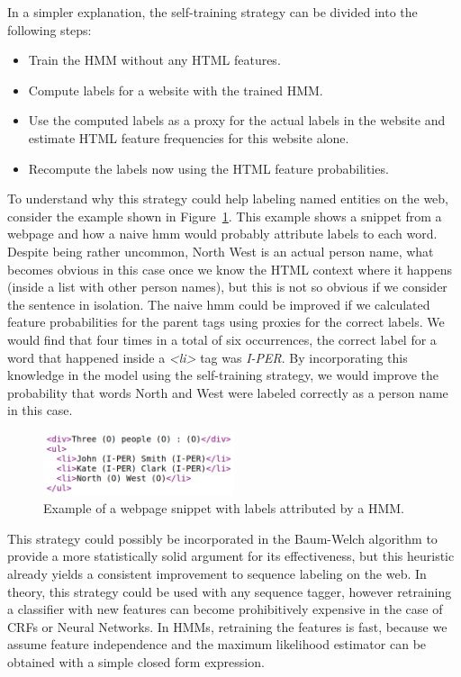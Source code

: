 \documentclass{nle}
\begin{document}
In a simpler explanation, the self-training strategy can be divided into the following steps:
%
\begin{itemize}
\item Train the HMM without any HTML features.
\item Compute labels for a website with the trained HMM.
\item Use the computed labels as a proxy for the actual labels in the 
website and estimate HTML feature frequencies for this website alone.
\item Recompute the labels now using the HTML feature probabilities.
\end{itemize}
%
To understand why this strategy could help labeling named entities on the web, consider the 
example shown in Figure~\ref{fig:self_training}. This example shows a snippet from a webpage 
and how a naive \gls{hmm} would probably attribute 
labels to each word. Despite being rather uncommon, North West is an actual person name,
what becomes obvious in this case once we know the HTML context where it happens 
(inside a list with other person names), but this is not so obvious if we consider the
sentence in isolation. The naive \gls{hmm} could be improved if we calculated
feature probabilities for the parent tags using proxies for the correct labels. We would find
that four times in a total of six occurrences, the correct label for a word that happened inside
a \textit{<li>} tag was \mbox{\textit{I-PER}}. By incorporating this knowledge in the model 
using the self-training strategy, we would improve the probability that words North and West 
were labeled correctly as a person name in this case.

\begin{figure}
  \centering
  \includegraphics[width=0.5\textwidth]{pics/self_training_example}
  \caption{Example of a webpage snippet with labels attributed by a HMM.}
  \label{fig:self_training}
\end{figure}

This strategy could possibly be incorporated in the Baum-Welch algorithm to provide a more 
statistically solid argument for its effectiveness, but this heuristic
already yields a consistent improvement to sequence labeling on the web. In theory, this 
strategy could be used with any sequence tagger, however retraining a classifier with new features can 
become prohibitively expensive in the case of CRFs or Neural Networks. 
In HMMs, retraining the features
is fast, because we assume feature independence and the maximum likelihood estimator can be 
obtained with a simple closed form expression.
\end{document}
